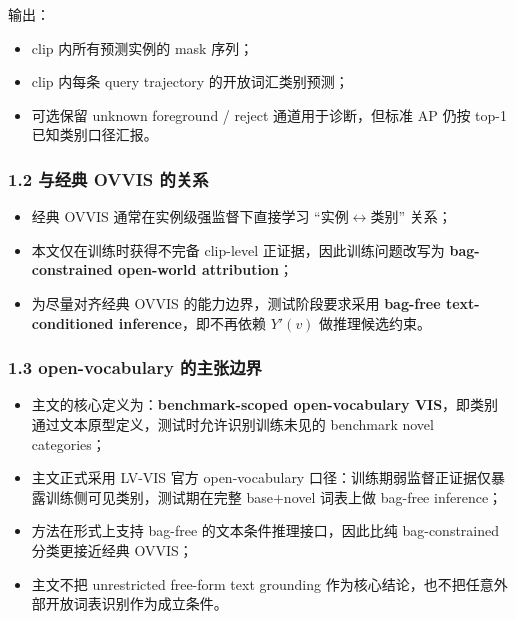 \documentclass[UTF8]{ctexart}
\begin{document}
输出：
\begin{itemize}
\item clip 内所有预测实例的 mask 序列；
\item clip 内每条 query trajectory 的开放词汇类别预测；
\item 可选保留 unknown foreground / reject 通道用于诊断，但标准 AP 仍按 top-1 已知类别口径汇报。
\end{itemize}

\subsubsection*{1.2 与经典 OVVIS 的关系}
\begin{itemize}
\item 经典 OVVIS 通常在实例级强监督下直接学习 ``实例$\leftrightarrow$类别'' 关系；
\item 本文仅在训练时获得不完备 clip-level 正证据，因此训练问题改写为 \textbf{bag-constrained open-world attribution}；
\item 为尽量对齐经典 OVVIS 的能力边界，测试阶段要求采用 \textbf{bag-free text-conditioned inference}，即不再依赖 $Y'(v)$ 做推理候选约束。
\end{itemize}

\subsubsection*{1.3 open-vocabulary 的主张边界}
\begin{itemize}
\item 主文的核心定义为：\textbf{benchmark-scoped open-vocabulary VIS}，即类别通过文本原型定义，测试时允许识别训练未见的 benchmark novel categories；
\item 主文正式采用 LV-VIS 官方 open-vocabulary 口径：训练期弱监督正证据仅暴露训练侧可见类别，测试期在完整 base+novel 词表上做 bag-free inference；
\item 方法在形式上支持 bag-free 的文本条件推理接口，因此比纯 bag-constrained 分类更接近经典 OVVIS；
\item 主文不把 unrestricted free-form text grounding 作为核心结论，也不把任意外部开放词表识别作为成立条件。
\end{itemize}

\par\noindent\hrulefill\par
\end{document}
